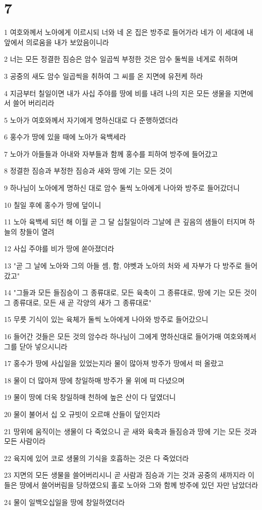\chapter{7}

\par 1 여호와께서 노아에게 이르시되 너와 네 온 집은 방주로 들어가라 네가 이 세대에 내 앞에서 의로움을 내가 보았음이니라
\par 2 너는 모든 정결한 짐승은 암수 일곱씩 부정한 것은 암수 둘씩을 네게로 취하며
\par 3 공중의 새도 암수 일곱씩을 취하여 그 씨를 온 지면에 유전케 하라
\par 4 지금부터 칠일이면 내가 사십 주야를 땅에 비를 내려 나의 지은 모든 생물을 지면에서 쓸어 버리리라
\par 5 노아가 여호와께서 자기에게 명하신대로 다 준행하였더라
\par 6 홍수가 땅에 있을 때에 노아가 육백세라
\par 7 노아가 아들들과 아내와 자부들과 함께 홍수를 피하여 방주에 들어갔고
\par 8 정결한 짐승과 부정한 짐승과 새와 땅에 기는 모든 것이
\par 9 하나님이 노아에게 명하신 대로 암수 둘씩 노아에게 나아와 방주로 들어갔더니
\par 10 칠일 후에 홍수가 땅에 덮이니
\par 11 노아 육백세 되던 해 이월 곧 그 달 십칠일이라 그날에 큰 깊음의 샘들이 터지며 하늘의 창들이 열려
\par 12 사십 주야를 비가 땅에 쏟아졌더라
\par 13 "곧 그 날에 노아와 그의 아들 셈, 함, 야벳과 노아의 처와 세 자부가 다 방주로 들어갔고"
\par 14 "그들과 모든 들짐승이 그 종류대로, 모든 육축이 그 종류대로, 땅에 기는 모든 것이 그 종류대로, 모든 새 곧 각양의 새가 그 종류대로"
\par 15 무릇 기식이 있는 육체가 둘씩 노아에게 나아와 방주로 들어갔으니
\par 16 들어간 것들은 모든 것의 암수라 하나님이 그에게 명하신대로 들어가매 여호와께서 그를 닫아 넣으시니라
\par 17 홍수가 땅에 사십일을 있었는지라 물이 많아져 방주가 땅에서 떠 올랐고
\par 18 물이 더 많아져 땅에 창일하매 방주가 물 위에 떠 다녔으며
\par 19 물이 땅에 더욱 창일하매 천하에 높은 산이 다 덮였더니
\par 20 물이 불어서 십 오 규빗이 오르매 산들이 덮인지라
\par 21 땅위에 움직이는 생물이 다 죽었으니 곧 새와 육축과 들짐승과 땅에 기는 모든 것과 모든 사람이라
\par 22 육지에 있어 코로 생물의 기식을 호흡하는 것은 다 죽었더라
\par 23 지면의 모든 생물을 쓸어버리시니 곧 사람과 짐승과 기는 것과 공중의 새까지라 이들은 땅에서 쓸어버림을 당하였으되 홀로 노아와 그와 함께 방주에 있던 자만 남았더라
\par 24 물이 일백오십일을 땅에 창일하였더라


